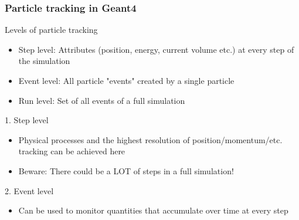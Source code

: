 \begin{frame}
\frametitle{Particle tracking in Geant4}

\begin{block}{Levels of particle tracking}
	\begin{itemize}
		\item Step level: Attributes (position, energy, current volume etc.) at every step of the simulation
		\item Event level: All particle "events" created by a single particle
		\item Run level: Set of all events of a full simulation
	\end{itemize}
\end{block}

\begin{alertblock}{1. Step level}
	\begin{itemize}
		\item Physical processes and the highest resolution of position/momentum/etc. tracking can be achieved here
		\item Beware: There could be a LOT of steps in a full simulation!
	\end{itemize}
\end{alertblock}

\begin{alertblock}{2. Event level}
	\begin{itemize}
		\item Can be used to monitor quantities that accumulate over time at every step
	\end{itemize}
\end{alertblock}


\end{frame}